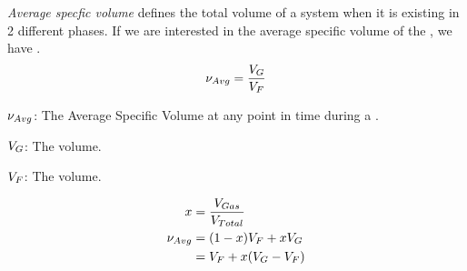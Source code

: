 \begin{definition}\label{def:Average_Specific_Volume}
  \emph{Average specfic volume} defines the total volume of a system when it is existing in 2 different phases.
  If we are interested in the average specific volume of the , we have .
  \begin{equation}\label{eq:Average_Specific_Volume}
    \nu_{Avg} = \frac{V_{G}}{V_{F}}
  \end{equation}

  \begin{description}[noitemsep]
  \item $\nu_{Avg}$: The Average Specific Volume at any point in time during a .
  \item $V_{G}$: The  volume.
  \item $V_{F}$: The  volume.
  \end{description}

  \begin{equation}\label{eq:Average_Specific_Volume_Using_Quality}
    \begin{aligned}
      x &= \frac{V_{Gas}}{V_{Total}} \\
      \nu_{Avg} &= (1 - x) V_{F} + x V_{G} \\
      &= V_{F} + x (V_{G} - V_{F})
    \end{aligned}
  \end{equation}
\end{definition}


